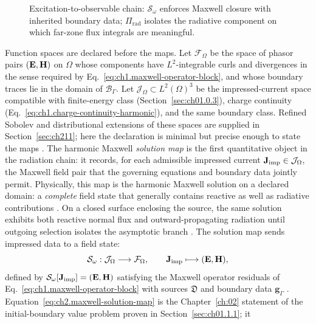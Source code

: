 \begin{figure}[t]
\centering
\VolIPhysFig{\VolIPhysSourceRadiationSequence}
\caption{Excitation-to-observable chain: \(\mathcal{S}_\omega\) enforces Maxwell
closure with inherited boundary data; \(\Pi_{\mathrm{rad}}\) isolates the
radiative component on which far-zone flux integrals are meaningful.}
\label{fig:ch2.source-radiation-sequence}
\end{figure}

Function spaces are declared before the maps. Let $\mathcal{F}_\Omega$ be the
space of phasor pairs \((\mathbf{E},\mathbf{H})\) on \(\Omega\) whose components have
\(L^{2}\)-integrable curls and divergences in the sense required by
Eq.~\eqref{eq:ch1.maxwell-operator-block}, and whose boundary traces lie in the
domain of \(\mathcal{B}_\Gamma\). Let \(\mathcal{J}_\Omega\subset L^{2}(\Omega)^{3}\)
be the impressed-current space compatible with finite-energy class
(Section~\ref{sec:ch01.0.3}), charge continuity
(Eq.~\eqref{eq:ch1.charge-continuity-harmonic}), and the same boundary class.
Refined Sobolev and distributional extensions of these spaces are supplied in
Section~\ref{sec:ch211}; here the declaration is minimal but precise enough to
state the maps \cite{stratton1941}. The harmonic Maxwell \emph{solution map} is the
first quantitative object in the radiation chain: it records, for each admissible impressed
current \(\mathbf{J}_{\mathrm{imp}}\in\mathcal{J}_\Omega\), the Maxwell field pair that the governing
equations and boundary data jointly permit. Physically, this map is the harmonic Maxwell solution on a declared domain: a
\emph{complete} field state that generally contains reactive as well as radiative
contributions \cite{stratton1941}. On a closed surface enclosing the source, the same
solution exhibits both reactive normal flux and outward-propagating radiation until
outgoing selection isolates the asymptotic branch \cite{harrington2001}. The solution
map sends impressed data to a field state:
\begin{equation}
\label{eq:ch2.maxwell-solution-map}
\mathcal{S}_\omega:\mathcal{J}_\Omega\longrightarrow\mathcal{F}_\Omega,
\qquad
\mathbf{J}_{\mathrm{imp}}\longmapsto(\mathbf{E},\mathbf{H}),
\end{equation}
defined by \(\mathcal{S}_\omega[\mathbf{J}_{\mathrm{imp}}]=(\mathbf{E},\mathbf{H})\) satisfying the Maxwell operator
residuals of Eq.~\eqref{eq:ch1.maxwell-operator-block} with sources \(\mathfrak{D}\)
and boundary data \(\mathbf{g}_\Gamma\) \cite{stratton1941}.
Equation~\eqref{eq:ch2.maxwell-solution-map} is the Chapter~\ref{ch:02} statement
of the initial-boundary value problem proven in Section~\ref{sec:ch01.1.1}; it

